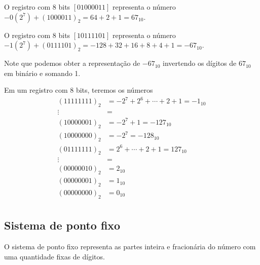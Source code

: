 \begin{ex}
 O registro com $8$ bits $[01000011]$ representa o número
 $-0(2^7)+(1000011)_2=64+2+1=67_{10}$.

 O registro com $8$ bits $[10111101]$ representa o número
 $-1(2^7)+(0111101)_2=-128+ 32+16+8+4+1=-67_{10}$.

 Note que podemos obter a representação de $-67_{10}$ invertendo os dígitos de $67_{10}$ em binário e somando 1.
\end{ex}

\begin{ex}
Em um registro com $8$ bits, teremos os números
$$
\begin{array}{cl}
 (11111111)_2 &= -2^7+2^{6}+\cdots+2+1=-1_{10}\\
     \vdots   &=  \\
 (10000001)_2 &= -2^7+1 = -127_{10} \\
 (10000000)_2 &= -2^7   = -128_{10} \\
 (01111111)_2 &= 2^6+\cdots+2+1=127_{10} \\
     \vdots    &=  \\
 (00000010)_2 &= 2_{10} \\
 (00000001)_2 &= 1_{10} \\
 (00000000)_2 &= 0_{10} \\
\end{array}
$$
\end{ex}





\subsection{Sistema de ponto fixo}
O sistema de ponto fixo representa as partes inteira e fracionária do número com uma quantidade fixas de dígitos. 

